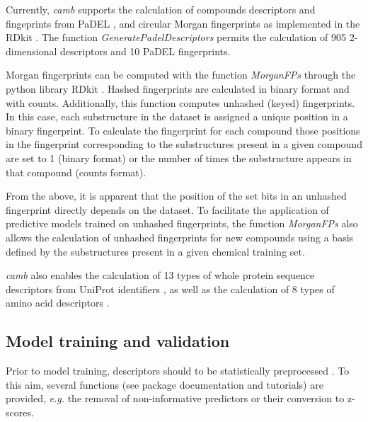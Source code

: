 \documentclass{bioinfo}
\begin{document}
Currently, {\it camb} supports the calculation of compounds descriptors and fingeprints from PaDEL \citep{padel},
and circular Morgan fingerprints \citep{extended_fp} as implemented in the RDkit \citep{rdkit}.
The function {\it GeneratePadelDescriptors} permits the calculation of 905 2-dimensional descriptors and 10 PaDEL fingerprints.

Morgan fingerprints can be computed with the function {\it MorganFPs}
through the python library RDkit \citep{rdkit}.
Hashed fingerprints are calculated in binary format and with counts.
Additionally, this function computes unhashed (keyed) fingerprints.
In this case, each substructure in the dataset is assigned a unique position in a binary fingerprint.
To calculate the fingerprint for each compound those positions in the fingerprint corresponding to the substructures 
present in a given compound are set to 1 (binary format)
or the number of times the substructure appears in that compound (counts format).

From the above, it is apparent that the position of the set bits in an unhashed fingerprint
directly depends on the dataset.
To facilitate the application of predictive models trained on unhashed fingerprints,
the function {\it MorganFPs} also allows the calculation of unhashed fingerprints for new compounds
using a basis defined by the substructures present in a given chemical training set.

{\it camb} also enables the calculation of 13 types of whole protein sequence descriptors
from UniProt identifiers \citep{protr},
as well as the calculation of 8 types of amino acid descriptors \citep{AA_benchmark}.

\subsection{Model training and validation}

Prior to model training, descriptors should to be statistically preprocessed \citep{andersson}.
To this aim, several functions (see package documentation and tutorials)
are provided, {\it e.g.} the removal of non-informative predictors or
their conversion to z-scores.
\end{document}
